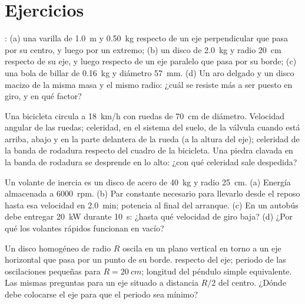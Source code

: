 \section{Ejercicios}

\begin{exercise}[$\star$]\label{exo:b2:rigid-body-mechanics:1}
: (a) una varilla de \qty{1.0}{m} y \qty{0.50}{kg}
respecto de un eje perpendicular que pasa por su centro, y luego por un
extremo; (b) un disco de \qty{2.0}{kg} y radio \qty{20}{cm} respecto de su
eje, y luego respecto de un eje paralelo que pasa por su borde; (c) una
bola de billar de \qty{0.16}{kg} y diámetro \qty{57}{mm}. (d) Un aro
delgado y un disco macizo de la misma masa y el mismo radio: ¿cuál se
resiste más a ser puesto en giro, y en qué factor?
\end{exercise}

\begin{exercise}[$\star$]\label{exo:b2:rigid-body-mechanics:2}
Una bicicleta circula a \qty{18}{km/h} con ruedas de \qty{70}{cm} de
diámetro. Velocidad angular de las ruedas; celeridad, en el sistema del
suelo, de la válvula cuando está arriba, abajo y en la parte delantera de
la rueda (a la altura del eje); celeridad de la banda de rodadura respecto
del cuadro de la bicicleta. Una piedra clavada en la banda de rodadura se
desprende en lo alto: ¿con qué celeridad sale despedida?
\end{exercise}

\begin{exercise}[$\star$]\label{exo:b2:rigid-body-mechanics:3}
Un volante de inercia es un disco de acero de \qty{40}{kg} y radio
\qty{25}{cm}. (a) Energía almacenada a \qty{6000}{rpm}. (b) Par constante
necesario para llevarlo desde el reposo hasta esa velocidad en
\qty{2.0}{min}; potencia al final del arranque. (c) En un autobús debe
entregar \qty{20}{kW} durante \qty{10}{s}: ¿hasta qué velocidad de giro
baja? (d) ¿Por qué los volantes rápidos funcionan en vacío?
\end{exercise}

\begin{exercise}[$\star$]\label{exo:b2:rigid-body-mechanics:4}
Un disco homogéneo de radio $R$ oscila en un plano vertical en torno a un
eje horizontal que pasa por un punto de su borde. 
respecto del eje; periodo de las oscilaciones pequeñas para
$R = \qty{20}{cm}$; longitud del péndulo simple equivalente. Las mismas
preguntas para un eje situado a distancia $R/2$ del centro. ¿Dónde debe
colocarse el eje para que el periodo sea mínimo?
\end{exercise}

